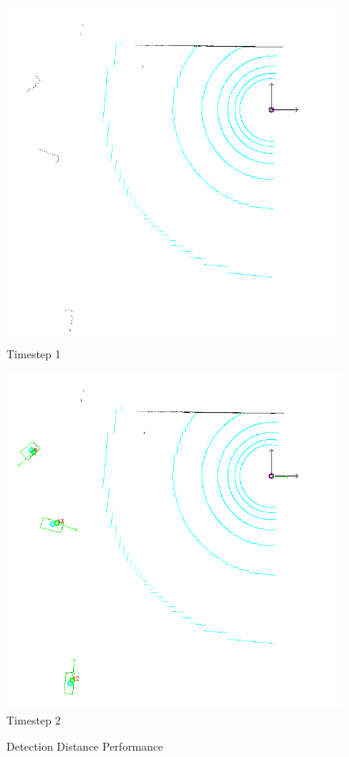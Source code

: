 \documentclass[11pt,oneside,openright]{mpreport}
\begin{document}
\begin{figure}[htb]
  \caption{Detection Distance Performance} 
    \centering
    \begin{minipage}[t]{0.49\textwidth}
        \centering
        \includegraphics[width=\textwidth]{bilder/alg/img100001_s.png}
        Timestep 1
    \end{minipage}%
    \hfill
    \begin{minipage}[t]{0.49\textwidth}
        \centering
	\includegraphics[width=\textwidth]{bilder/alg/img100002_s.png}
        Timestep 2
    \end{minipage}
    \label{detection_performance}
\end{figure}
\end{document}
